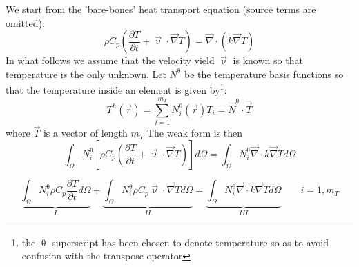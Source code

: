 We start from the 'bare-bones' heat transport equation (source terms are omitted): 
\begin{equation}
\rho C_p \left( \frac{\partial T}{\partial t} + {\vec \upnu}\cdot {\vec\nabla T} \right)
= {\vec \nabla} \cdot \left( k \vec\nabla T \right)
\end{equation}
In what follows we assume that the velocity vield $\vec \upnu$ is known so that temperature is the 
only unknown.
Let $N^\uptheta$ be the temperature basis functions so that the temperature inside an element is 
given by\footnote{the $\uptheta$ superscript has been chosen to denote temperature so as to avoid confusion
with the transpose operator}:
\begin{equation}
T^h({\vec r}) = \sum_{i=1}^{m_T} N^\uptheta_i ({\vec r}) T_i = \vec N^\uptheta \cdot \vec T
\end{equation}
where $\vec T$ is a vector of length $m_T$
The weak form is then 
\begin{equation}
\int_\Omega N^\uptheta_i \left[ 
\rho C_p \left( \frac{\partial T}{\partial t} + {\vec \upnu}\cdot {\vec\nabla T} \right) \right] d\Omega
= \int_\Omega  N^\uptheta_i {\vec \nabla} \cdot k \vec\nabla T  d\Omega
\end{equation}

\begin{equation}
\underbrace{\int_\Omega N^\uptheta_i  \rho C_p \frac{\partial T}{\partial t} d\Omega}_{I}
+ \underbrace{\int_\Omega N^\uptheta_i  \rho C_p  {\vec \upnu}\cdot {\vec\nabla T}   d\Omega}_{II}
= \underbrace{\int_\Omega  N^\uptheta_i {\vec \nabla} \cdot k \vec\nabla T d\Omega}_{III}
\quad\quad
i=1,m_T
\end{equation}

